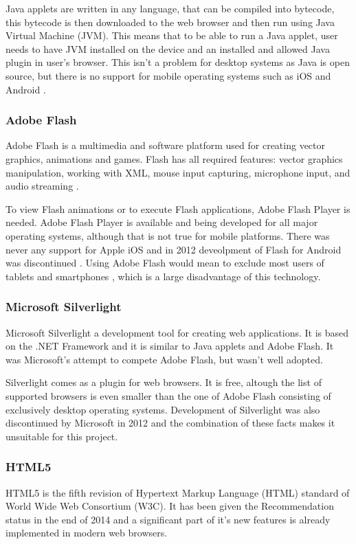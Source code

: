 Java applets are written in any language, that can be compiled into bytecode, this bytecode is then downloaded to the web browser and then run using Java Virtual Machine (JVM). This means that to be able to run a Java applet, user needs to have JVM installed on the device and an installed and allowed Java plugin in user's browser. This isn't a problem for desktop systems as Java is open source, but there is no support for mobile operating systems such as iOS and Android \cite{}. 

\subsubsection{Adobe Flash}
Adobe Flash is a multimedia and software platform used for creating vector graphics, animations and games. Flash has all required features: vector graphics manipulation, working with XML, mouse input capturing, microphone input, and audio streaming \cite{}. 

To view Flash animations or to execute Flash applications, Adobe Flash Player is needed. Adobe Flash Player is available and being developed for all major operating systems, although that is not true for mobile platforms. There was never any support for Apple iOS \cite{} and in 2012 deveolpment of Flash for Android was discontinued \cite{}. Using Adobe Flash would mean to exclude most users of tablets and smartphones \cite{}, which is a large disadvantage of this technology.

\subsubsection{Microsoft Silverlight}
Microsoft Silverlight \cite{} a development tool for creating web applications. It is based on the .NET Framework and it is similar to Java applets and Adobe Flash. It was Microsoft's attempt to compete Adobe Flash, but wasn't well adopted.

Silverlight comes as a plugin for web browsers. It is free, altough the list of supported browsers is even smaller \cite{} than the one of Adobe Flash consisting of exclusively desktop operating systems. Development of Silverlight was also discontinued by Microsoft in 2012 and the combination of these facts makes it unsuitable for this project.

\subsubsection{HTML5}
HTML5 is the fifth revision of Hypertext Markup Language (HTML) standard of World Wide Web Consortium (W3C). It has been given the Recommendation status in the end of 2014 and a significant part of it's new features is already implemented in modern web browsers.

